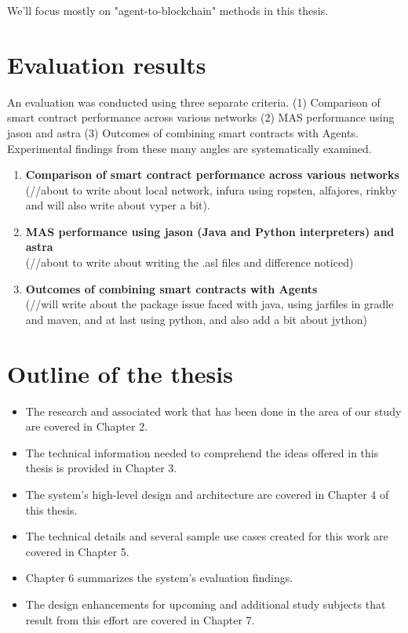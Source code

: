 \vspace{.5cm}

We'll focus mostly on "agent-to-blockchain" methods in this thesis.

\section{Evaluation results}

An evaluation was conducted using three separate criteria. (1) Comparison of smart contract performance across various networks (2) \ac{MAS} performance using jason and astra (3) Outcomes of combining smart contracts with Agents. Experimental findings from these many angles are systematically examined.

\newcommand\descitem[1]{\item{\bfseries #1}\\}
\begin{enumerate}
  \descitem{Comparison of smart contract performance across various networks} (//about to write about local network, infura using ropsten, alfajores, rinkby and will also write about vyper a bit).
  \descitem{\ac{MAS} performance using jason (Java and Python interpreters) and astra} (//about to write about writing the .asl files and difference noticed)
  \descitem{Outcomes of combining smart contracts with Agents} (//will write about the package issue faced with java, using jarfiles in gradle and maven, and at last using python, and also add a bit about jython)
\end{enumerate}


\section{Outline of the thesis}
\begin{itemize}
    \item The research and associated work that has been done in the area of our study are covered in Chapter 2.
    \item The technical information needed to comprehend the ideas offered in this thesis is provided in Chapter 3.
    \item The system's high-level design and architecture are covered in Chapter 4 of this thesis.
    \item The technical details and several sample use cases created for this work are covered in Chapter 5.
    \item Chapter 6 summarizes the system's evaluation findings.
    \item The design enhancements for upcoming and additional study subjects that result from this effort are covered in Chapter 7.
\end{itemize}